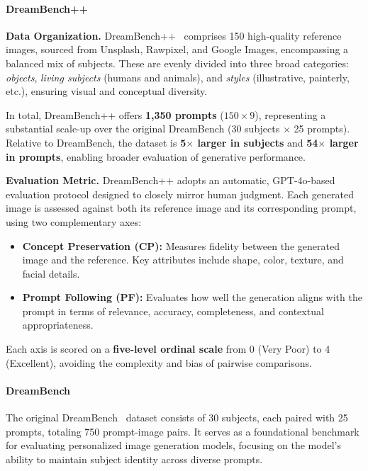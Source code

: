 \paragraph{DreamBench++}
\label{app:DreamBench_Plus}

\textbf{Data Organization.}
DreamBench++~\citep{peng2025dreambenchpp} comprises 150 high-quality reference images, sourced from Unsplash, Rawpixel, and Google Images, encompassing a balanced mix of subjects. These are evenly divided into three broad categories: \textit{objects}, \textit{living subjects} (humans and animals), and \textit{styles} (illustrative, painterly, etc.), ensuring visual and conceptual diversity.

In total, DreamBench++ offers \textbf{1,350 prompts} ($150 \times 9$), representing a substantial scale-up over the original DreamBench (30 subjects $\times$ 25 prompts). Relative to DreamBench, the dataset is \textbf{5$\times$ larger in subjects} and \textbf{54$\times$ larger in prompts}, enabling broader evaluation of generative performance.

\textbf{Evaluation Metric.}
DreamBench++ adopts an automatic, GPT-4o-based evaluation protocol designed to closely mirror human judgment. Each generated image is assessed against both its reference image and its corresponding prompt, using two complementary axes:

\begin{itemize}[left=2pt, itemsep=0.5pt,topsep=0.5pt]
\item \textbf{Concept Preservation (CP):} Measures fidelity between the generated image and the reference. Key attributes include shape, color, texture, and facial details.
\item \textbf{Prompt Following (PF):} Evaluates how well the generation aligns with the prompt in terms of relevance, accuracy, completeness, and contextual appropriateness.
\end{itemize}

Each axis is scored on a \textbf{five-level ordinal scale} from 0 (Very Poor) to 4 (Excellent), avoiding the complexity and bias of pairwise comparisons.

\paragraph{DreamBench}
The original DreamBench~\citep{ruiz2023dreamboothfinetuningtexttoimage} dataset consists of 30 subjects, each paired with 25 prompts, totaling 750 prompt-image pairs. It serves as a foundational benchmark for evaluating personalized image generation models, focusing on the model's ability to maintain subject identity across diverse prompts.


